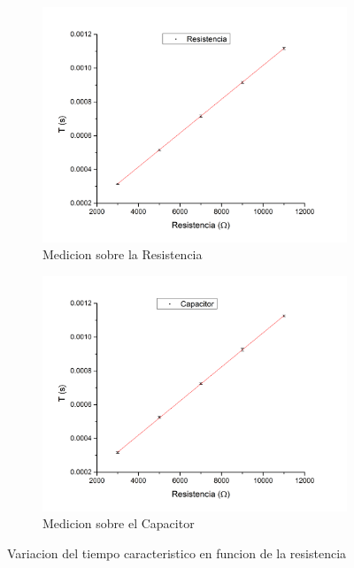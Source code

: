 \documentclass[11pt,a4paper]{article}
\begin{document}
\begin{figure}[H]

\begin{subfigure}{0.5\textwidth}
\includegraphics[scale=0.30]{Tau-RCvsR_Resistencia}
  \caption{Medicion sobre la Resistencia}
  \label{subfig:RCvsRR}
\end{subfigure}
\begin{subfigure}{0.5\textwidth}
\includegraphics[scale=0.30]{Tau-RCvsR_Capacitor}
  \caption{Medicion sobre el Capacitor}
  \label{subfig:RCvsRC}
\end{subfigure}

  \label{fig:RCvsR}
  \caption{Variacion del tiempo caracteristico en funcion de la resistencia}
\end{figure}
\end{document}
